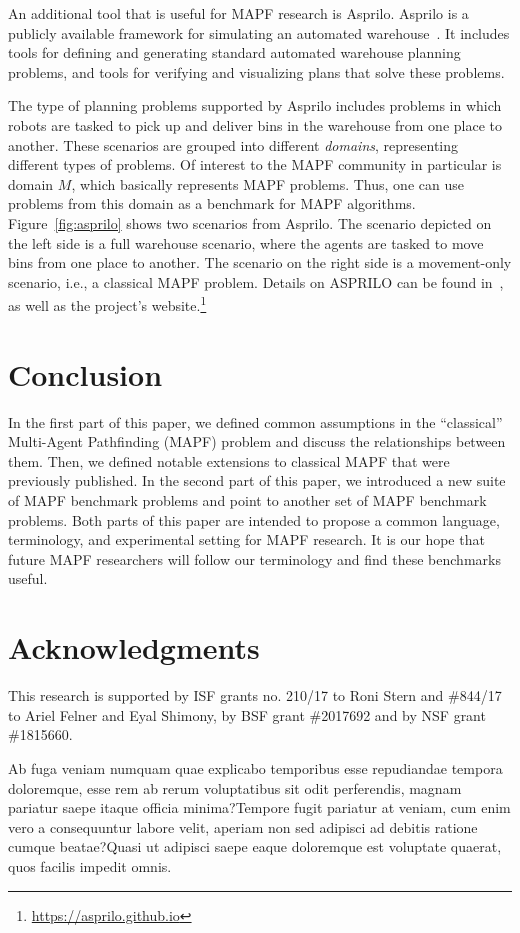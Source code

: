 \documentclass[letterpaper]{article} %
\newcommand{\mapf}{\ac{MAPF}\xspace}
\newcommand{\comment}[1]{{\nb{\textbf{Comment:}}{orange}{#1}}}
\begin{document}
An additional tool that is useful for \mapf research is Asprilo.
Asprilo is a publicly available framework for simulating an automated warehouse~\cite{martin2018experimenting}. It includes tools for defining and generating standard automated warehouse planning problems, and tools for verifying and visualizing plans that solve these problems.

The type of planning problems supported by Asprilo includes problems in which robots are tasked to pick up and deliver bins in the warehouse from one place to another. These scenarios are grouped into different \emph{domains}, representing different types of problems. Of interest to the \mapf community in particular is domain $M$, which basically represents \mapf problems. Thus, one can use problems from this domain as a benchmark for \mapf algorithms.
Figure~\ref{fig:asprilo} shows two scenarios from Asprilo. The scenario depicted on the left side is a full warehouse scenario, where the agents are tasked to move bins from one place to another. The scenario on the right side is a movement-only scenario, i.e., a classical \mapf problem.
Details on ASPRILO can be found in~\cite{martin2018experimenting}, as well as the project's website.\footnote{\url{https://asprilo.github.io}}

\section{Conclusion}
In the first part of this paper, we defined common assumptions in the ``classical'' Multi-Agent Pathfinding (\mapf) problem and discuss the relationships between them. Then, we defined notable extensions to classical \mapf that were previously published.
In the second part of this paper, we introduced a new suite of \mapf benchmark problems and point to another set of \mapf benchmark problems.
Both parts of this paper are intended to propose a common language, terminology, and experimental setting for \mapf research. It is our hope that future \mapf researchers will follow our terminology and find these benchmarks useful.

\section{Acknowledgments}
This research is supported by ISF grants no. 210/17 to Roni Stern and \#844/17 to Ariel Felner and Eyal Shimony, by BSF grant \#2017692 and by NSF grant \#1815660. %


\vskip 0.2in
Ab fuga veniam numquam quae explicabo temporibus esse repudiandae tempora doloremque, esse rem ab rerum voluptatibus sit odit perferendis, magnam pariatur saepe itaque officia minima?Tempore fugit pariatur at veniam, cum enim vero a consequuntur labore velit, aperiam non sed adipisci ad debitis ratione cumque beatae?Quasi ut adipisci saepe eaque doloremque est voluptate quaerat, quos facilis  impedit omnis.\clearpage


\end{document}
